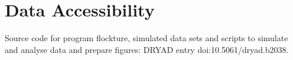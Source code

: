 \documentclass[11pt]{article}
\begin{document}
\renewcommand{\baselinestretch}{1.66}
\normalsize

\maketitle

\begin{abstract}

\end{abstract}







\section{Data Accessibility}
Source code for program {\sc flockture}, simulated data sets and scripts to simulate and analyse data
and prepare figures: DRYAD entry doi:10.5061/dryad.b2038.


\newpage
\listoffigures
\newpage
\end{document}
